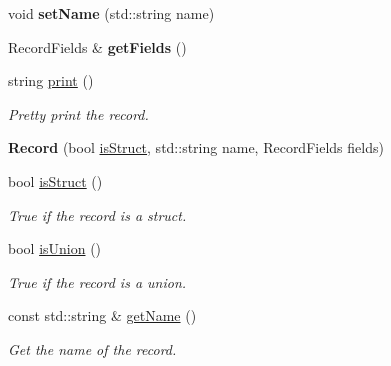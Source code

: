 \begin{DoxyCompactItemize}
void {\bfseries set\+Name} (std\+::string name)
\item 
\mbox{\label{classspan_1_1ir_1_1types_1_1Record_a05e79db8aea9223929287703d94d7bf4}} 
Record\+Fields \& {\bfseries get\+Fields} ()
\item 
\mbox{\label{classspan_1_1ir_1_1types_1_1Record_a0e98373ea726124438e5444b147e846c}} 
string \hyperlink{classspan_1_1ir_1_1types_1_1Record_a0e98373ea726124438e5444b147e846c}{print} ()
\begin{DoxyCompactList}\small\item\em Pretty print the record. \end{DoxyCompactList}\item 
\mbox{\label{classspan_1_1ir_1_1types_1_1Record_a5ce0dfcf546e45caa102039a7745be7d}} 
{\bfseries Record} (bool \hyperlink{classspan_1_1ir_1_1types_1_1Record_a631af1ee00c453b7dc58ccaeb4684f7b}{is\+Struct}, std\+::string name, Record\+Fields fields)
\item 
\mbox{\label{classspan_1_1ir_1_1types_1_1Record_a0804691941b54d8be8f5f80e58d96f2d}} 
bool \hyperlink{classspan_1_1ir_1_1types_1_1Record_a0804691941b54d8be8f5f80e58d96f2d}{is\+Struct} ()
\begin{DoxyCompactList}\small\item\em True if the record is a struct. \end{DoxyCompactList}\item 
\mbox{\label{classspan_1_1ir_1_1types_1_1Record_a46ba665a6693c7d382552d5cfc770a36}} 
bool \hyperlink{classspan_1_1ir_1_1types_1_1Record_a46ba665a6693c7d382552d5cfc770a36}{is\+Union} ()
\begin{DoxyCompactList}\small\item\em True if the record is a union. \end{DoxyCompactList}\item 
\mbox{\label{classspan_1_1ir_1_1types_1_1Record_ac6d8b08bf5a83211dafe8089e30b40f8}} 
const std\+::string \& \hyperlink{classspan_1_1ir_1_1types_1_1Record_ac6d8b08bf5a83211dafe8089e30b40f8}{get\+Name} ()
\begin{DoxyCompactList}\small\item\em Get the name of the record. \end{DoxyCompactList}\item 

\end{DoxyCompactItemize}
